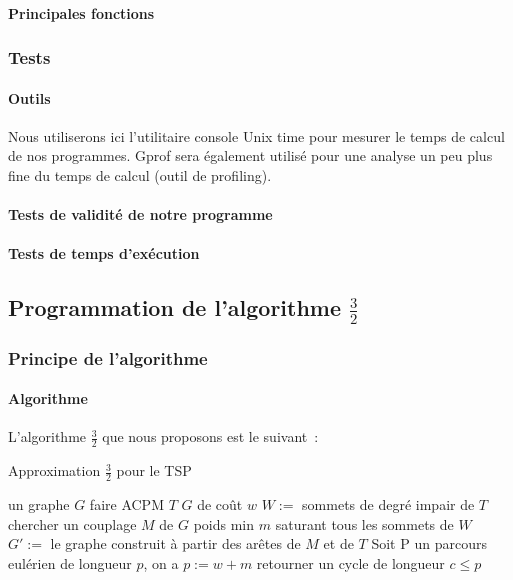 \documentclass[a4paper, 12pt]{article}
\begin{document}
\paragraph{Principales fonctions}

\subsubsection{Tests}

\paragraph{Outils}

Nous utiliserons ici l'utilitaire console Unix time pour mesurer le
temps de calcul de nos programmes. Gprof sera également utilisé pour
une analyse un peu plus fine du temps de calcul (outil de profiling).

\paragraph{Tests de validité de notre programme}

\paragraph{Tests de temps d'exécution}


\subsection{Programmation de l'algorithme $\frac{3}{2}$}

\subsubsection{Principe de l'algorithme}

\paragraph{Algorithme}

L'algorithme $\frac{3}{2}$ que nous proposons est le suivant~:

\begin{algorithm}[!ht]
\caption{Approximation $\frac{3}{2}$ pour le TSP}
\label{3-2tsp}
\begin{algorithmic}[1]
\REQUIRE un graphe $G$
\STATE faire ACPM $T$ $G$ de coût $w$
\STATE $W := $ sommets de degré impair de $T$
\STATE chercher un couplage $M$ de $G$ poids min $m$ saturant tous les
sommets de $W$
\STATE $G' := $ le graphe construit à partir des arêtes de $M$ et de
$T$
\STATE Soit P un parcours eulérien de longueur $p$, on a $p:= w + m$
\STATE retourner un cycle de longueur $c \leq p$
\end{algorithmic}
\end{algorithm}
\end{document}
